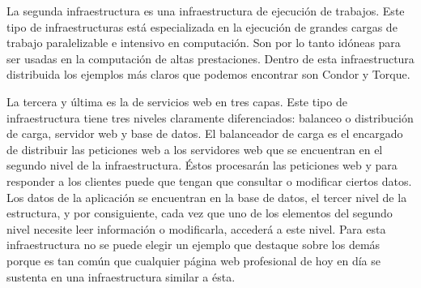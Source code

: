 

La segunda infraestructura es una infraestructura de ejecución de trabajos. Este tipo de infraestructuras está especializada en la ejecución de grandes cargas de trabajo paralelizable e intensivo en computación. Son por lo tanto idóneas para ser usadas en la computación de altas prestaciones. Dentro de esta infraestructura distribuida los ejemplos más claros que podemos encontrar son Condor y Torque.

La tercera y última es la de servicios web en tres capas. Este tipo de infraestructura tiene tres niveles claramente diferenciados: balanceo o distribución de carga, servidor web y base de datos. El balanceador de carga es el encargado de distribuir las peticiones web a los servidores web que se encuentran en el segundo nivel de la infraestructura. Éstos procesarán las peticiones web y para responder a los clientes puede que tengan que consultar o modificar ciertos datos. Los datos de la aplicación se encuentran en la base de datos, el tercer nivel de la estructura, y por consiguiente, cada vez que uno de los elementos del segundo nivel necesite leer información o modificarla, accederá a este nivel. Para esta infraestructura no se puede elegir un ejemplo que destaque sobre los demás porque es tan común que cualquier página web profesional de hoy en día se sustenta en una infraestructura similar a ésta.\\

